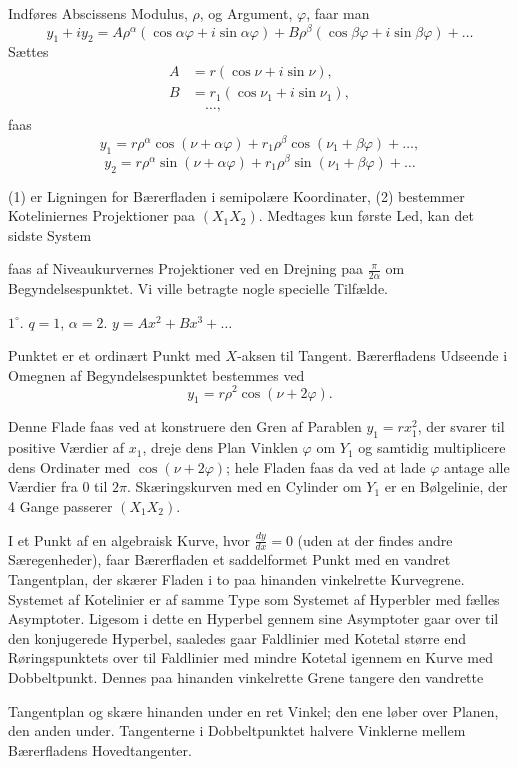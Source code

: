 \documentclass{article}
\begin{document}
Indføres Abscissens Modulus, $\rho$, og Argument, $\varphi$, faar man
\[
y_1 + i y_2 = A \rho^\alpha (\cos \alpha\varphi + i \sin \alpha\varphi) + B \rho^\beta (\cos \beta\varphi + i \sin \beta\varphi) + \dots
\]
Sættes
\[
\begin{aligned}
A &= r (\cos \nu + i \sin \nu), \\
B &= r_1 (\cos \nu_1 + i \sin \nu_1), \\
&\quad\dots,
\end{aligned}
\]
faas
\[
y_1 = r \rho^\alpha \cos (\nu + \alpha\varphi) + r_1 \rho^\beta \cos (\nu_1 + \beta\varphi) + \dots, \tag{1}
\]
\[
y_2 = r \rho^\alpha \sin (\nu + \alpha\varphi) + r_1 \rho^\beta \sin (\nu_1 + \beta\varphi) + \dots \tag{2}
\]

(1) er Ligningen for Bærerfladen i semipolære Koordinater, (2) bestemmer Koteliniernes Projektioner paa $(X_1 X_2)$. Medtages kun første Led, kan det sidste System

faas af Niveaukurvernes Projektioner ved en Drejning paa $\frac{\pi}{2\alpha}$ om Begyndelsespunktet. Vi ville betragte nogle specielle Tilfælde.

$1^\circ$. $q = 1$, $\alpha = 2$. $y = A x^2 + B x^3 + \dots$

Punktet er et ordinært Punkt med $X$-aksen til Tangent. Bærerfladens Udseende i Omegnen af Begyndelsespunktet bestemmes ved
\[
y_1 = r \rho^2 \cos (\nu + 2\varphi).
\]

Denne Flade faas ved at konstruere den Gren af Parablen $y_1 = r x_1^2$, der svarer til positive Værdier af $x_1$, dreje dens Plan Vinklen $\varphi$ om $Y_1$ og samtidig multiplicere dens Ordinater med $\cos (\nu + 2\varphi)$; hele Fladen faas da ved at lade $\varphi$ antage alle Værdier fra 0 til $2\pi$. Skæringskurven med en Cylinder om $Y_1$ er en Bølgelinie, der 4 Gange passerer $(X_1 X_2)$.

I et Punkt af en algebraisk Kurve, hvor $\frac{dy}{dx} = 0$ (uden at der findes andre Særegenheder), faar Bærerfladen et saddelformet Punkt med en vandret Tangentplan, der skærer Fladen i to paa hinanden vinkelrette Kurvegrene. Systemet af Kotelinier er af samme Type som Systemet af Hyperbler med fælles Asymptoter. Ligesom i dette en Hyperbel gennem sine Asymptoter gaar over til den konjugerede Hyperbel, saaledes gaar Faldlinier med Kotetal større end Røringspunktets over til Faldlinier med mindre Kotetal igennem en Kurve med Dobbeltpunkt. Dennes paa hinanden vinkelrette Grene tangere den vandrette

Tangentplan og skære hinanden under en ret Vinkel; den ene løber over Planen, den anden under. Tangenterne i Dobbeltpunktet halvere Vinklerne mellem Bærerfladens Hovedtangenter.
\end{document}
